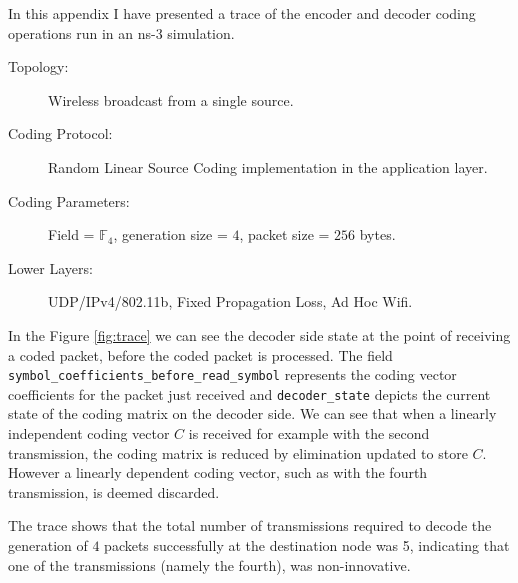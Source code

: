 \documentclass[12pt,a4paper,twoside,openright]{report}
\begin{document}
In this appendix I have presented a trace of the encoder and decoder coding operations run in an ns-3 simulation.
\begin{description}
	\item[Topology:] Wireless broadcast from a single source. 
	\item[Coding Protocol:] Random Linear Source Coding implementation in the application layer.
	\item[Coding Parameters:] Field = $\mathbb{F}_4$, generation size = $4$, packet size = $256$ bytes.
	\item[Lower Layers:] UDP/IPv4/802.11b, Fixed Propagation Loss, Ad Hoc Wifi.
\end{description}

In the Figure \ref{fig:trace} we can see the decoder side state at the point of receiving a coded packet, before the coded packet is processed. The field \texttt{symbol\_coefficients\_before\_read\_symbol} represents the coding vector coefficients for the packet just received and \texttt{decoder\_state} depicts the current state of the coding matrix on the decoder side. We can see that when a linearly independent coding vector $C$ is received for example with the second transmission, the coding matrix is reduced by elimination updated to store $C$. However a linearly dependent coding vector, such as with the fourth transmission, is deemed discarded.

The trace shows that the total number of transmissions required to decode the generation of $4$ packets successfully at the destination node was 5, indicating that one of the transmissions (namely the fourth), was non-innovative.
\end{document}
